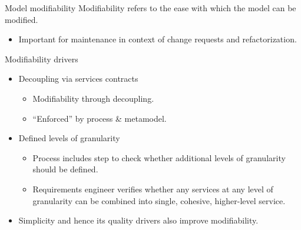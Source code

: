 \begin{frame}{Model modifiability}
  Modifiability refers to the ease with which the model can be modified.
    \begin{itemize}
     \item Important for maintenance in context of change requests and refactorization.
    \end{itemize}
  \pause
  \begin{block}{Modifiability drivers}
	 \begin{itemize}
	   \item<+-| alert@+> Decoupling via services contracts
		  \begin{itemize}
			 \item Modifiability through decoupling.
			 \item ``Enforced'' by process \& metamodel.
		  \end{itemize}
	   \item<+-| alert@+> Defined levels of granularity
		  \begin{itemize}
			 \item Process includes step to check whether additional levels of granularity should be defined.
			 \item Requirements engineer verifies whether any services at any level of granularity can be combined into single, cohesive, higher-level service.
		  \end{itemize}
		\item<+-| alert@+> Simplicity and hence its quality drivers also improve modifiability.
	 \end{itemize}
  \end{block}
\end{frame}


